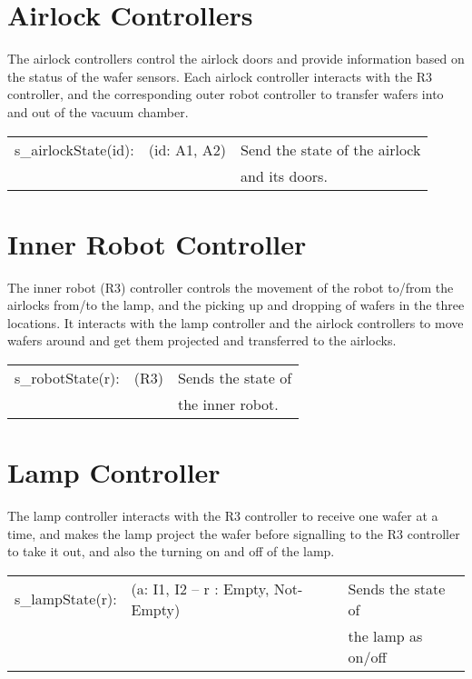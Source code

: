 \section{Airlock Controllers}

The airlock controllers control the airlock doors and provide information based on the status of the wafer sensors. Each airlock controller interacts with the R3 controller, and the corresponding outer robot controller to transfer wafers into and out of the vacuum chamber. 

\begin{tabular}{ l l l }
	s_airlockState(id): & (id: A1, A2) & Send the state of the airlock \\
	& & and its doors. \\
\end{tabular}

\section{Inner Robot Controller}

The inner robot (R3) controller controls the movement of the robot to/from the airlocks from/to the lamp, and the picking up and dropping of wafers in the three locations. It interacts with the lamp controller and the airlock controllers to move wafers around and get them projected and transferred to the airlocks.

\begin{tabular}{ l l l }
	s_robotState(r): & (R3) & Sends the state of  \\
	& & the inner robot. \\
\end{tabular}

\section{Lamp Controller}

The lamp controller interacts with the R3 controller to receive one wafer at a time, and makes the lamp project the wafer before signalling to the R3 controller to take it out, and also the turning on and off of the lamp.

\begin{tabular}{ l l l }
	s_lampState(r): & (a: I1, I2 -- r : Empty, Not-Empty) & Sends the state of  \\
	& & the lamp as on/off\\
\end{tabular}

